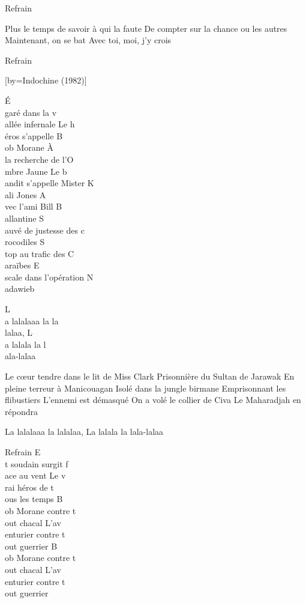 \beginverse
Refrain \\[bis]
\endverse

\beginverse
Plus le temps de savoir à qui la faute
De compter sur la chance ou les autres
Maintenant, on se bat
Avec toi, moi, j'y crois
\endverse

	Refrain

[by={Indochine (1982)}]

\beginverse
É\\[Mim]garé dans la v\\[Do]allée infernale
Le h\\[Sol]éros s'appelle B\\[Lam]ob Morane 
À\\[Mim] la recherche de l'O\\[Do]mbre Jaune 
Le b\\[Sol]andit s'appelle Mister K\\[Lam]ali Jones 
A\\[Mim]vec l'ami Bill B\\[Do]allantine 
S\\[Sol]auvé de justesse des c\\[Lam]rocodiles
S\\[Mim]top au trafic des C\\[Do]araïbes 
E\\[Sol]scale dans l'opération N\\[Lam]adawieb 
\endverse

\beginverse
L\\[Mim]a lalalaaa la la\\[Do]lalaa, L\\[Sol]a lalala la l\\[Lam]ala-lalaa \\[bis]
\endverse

\beginverse
Le cœur tendre dans le lit de Miss Clark 
Prisonnière du Sultan de Jarawak 
En pleine terreur à Manicouagan 
Isolé dans la jungle birmane
Emprisonnant les flibustiers
L'ennemi est démasqué
On a volé le collier de Civa
Le Maharadjah en répondra
\endverse

\beginverse
La lalalaaa la lalalaa, La lalala la lala-lalaa \\[bis]
\endverse

	Refrain
E\\[Lam]t soudain surgit f\\[Mim]ace au vent
Le v\\[Sol]rai héros de t\\[Ré]ous les temps
B\\[Lam]ob Morane contre t\\[Mim]out chacal
L'av\\[Sol]enturier contre t\\[Ré]out guerrier
B\\[Lam]ob Morane contre t\\[Mim]out chacal
L'av\\[Sol]enturier contre t\\[Ré]out guerrier

